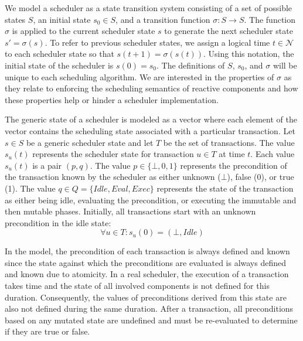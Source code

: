 We model a scheduler as a state transition system consisting of a set of possible states $S$, an initial state $s_0 \in S$, and a transition function $\sigma: S \to S$.
The function $\sigma$ is applied to the current scheduler state $s$ to generate the next scheduler state $s' = \sigma (s)$.
To refer to previous scheduler states, we assign a logical time $t \in \mathcal{N}$ to each scheduler state so that $s(t + 1) = \sigma (s(t))$.
Using this notation, the initial state of the scheduler is $s(0) = s_0$.
The definitions of $S$, $s_0$, and $\sigma$ will be unique to each scheduling algorithm.
We are interested in the properties of $\sigma$ as they relate to enforcing the scheduling semantics of reactive components and how these properties help or hinder a scheduler implementation.

The generic state of a scheduler is modeled as a vector where each element of the vector contains the scheduling state associated with a particular transaction.
Let $s \in S$ be a generic scheduler state and let $T$ be the set of transactions.
The value $s_u(t)$ represents the scheduler state for transaction $u \in T$ at time $t$.
Each value $s_u(t)$ is a pair $(p, q)$.
The value $p \in \{\bot, 0, 1\}$ represents the precondition of the transaction known by the scheduler as either unknown ($\bot$), false (0), or true (1).
The value $q \in Q = \{\mathit{Idle}, \mathit{Eval}, \mathit{Exec}\}$ represents the state of the transaction as either being idle, evaluating the precondition, or executing the immutable and then mutable phases.
Initially, all transactions start with an unknown precondition in the idle state:
\begin{equation}
  \forall u \in T : s_u(0) = (\bot, \mathit{Idle})
\end{equation}

In the model, the precondition of each transaction is always defined and known since the state against which the preconditions are evaluated is always defined and known due to atomicity.
In a real scheduler, the execution of a transaction takes time and the state of all involved components is not defined for this duration.
Consequently, the values of preconditions derived from this state are also not defined during the same duration.
After a transaction, all preconditions based on any mutated state are undefined and must be re-evaluated to determine if they are true or false.

